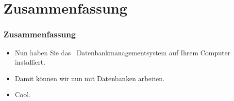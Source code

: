 \documentclass[aspectratio=169,mathserif,notheorems]{beamer}%
\begin{document}
\section{Zusammenfassung}%
%
\begin{frame}%
\frametitle{Zusammenfassung}%
\begin{itemize}%
\item Nun haben Sie das \postgresql\ Datenbankmanagementsystem auf Ihrem Computer installiert.%
\item<2-> Damit können wir nun mit  Datenbanken arbeiten.%
\item<3-> Cool.%
\end{itemize}%
\end{frame}%
%
\endPresentation%
\end{document}
